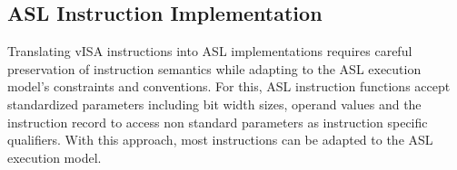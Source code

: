 



\subsection{ASL Instruction Implementation}

Translating vISA instructions into ASL implementations requires careful
preservation of instruction semantics while adapting to the ASL execution
model's constraints and conventions. For this, ASL instruction functions accept
standardized parameters including bit width sizes, operand values and the
instruction record to access non standard parameters as instruction specific
qualifiers. With this approach, most instructions can be adapted to the ASL
execution model.

